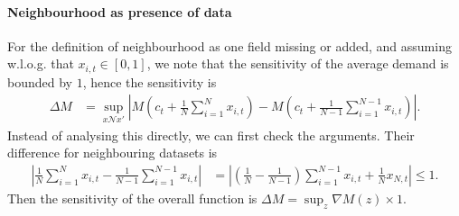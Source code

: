 \documentclass[a4paper,onecolumn]{article}
\numberwithin{algorithm}{section}
\theoremstyle{plain}
\theoremstyle{definition}
\theoremstyle{example}
\newcommand{\demand}{x}
\newcommand{\nmech}{M}
\newcommand{\neigh}{\mathcal{N}}
\newcommand{\sense}{\Delta}
\newcommand{\abs}[1] {\left|#1\right|}
\begin{document}
\paragraph{Neighbourhood as presence of data} For the definition of
neighbourhood as one field missing or added, and assuming
w.l.o.g. that $\demand_{i,t} \in [0, 1]$, we note that the sensitivity
of the average demand is bounded by $1$, hence the sensitivity is
\begin{align}
  \sense \nmech 
&= \sup_{\demand \neigh \demand'} \abs{M\left(c_t + \frac{1}{N} \sum_{i=1}^N \demand_{i,t}\right) - M\left(c_t + \frac{1}{N-1} \sum_{i=1}^{N-1} \demand_{i,t}\right)}.
\end{align}
Instead of analysing this directly, we can first check the arguments. Their difference for neighbouring datasets is
\begin{align}
 \abs{\frac{1}{N} \sum_{i=1}^N \demand_{i,t} - \frac{1}{N-1} \sum_{i=1}^{N-1} \demand_{i,t}}
  &=
    \abs{\left(\frac{1}{N} - \frac{1}{N-1}\right) \sum_{i=1}^{N-1} \demand_{i,t} + \frac{1}{N} \demand_{N, t}}
  \leq 1.
\end{align}
Then the sensitivity of the overall function is $\sense \nmech = \sup_z \nabla \nmech(z) \times 1$. 
\end{document}
